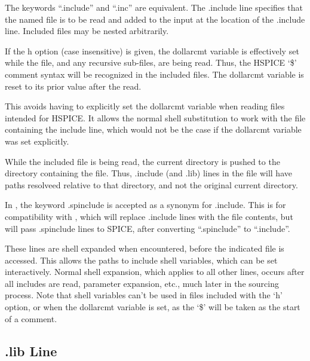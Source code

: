 The keywords ``{\vt .include}'' and ``{\vt .inc}'' are equivalent. 
The {\vt .include} line specifies that the named file is to be read
and added to the input at the location of the {\vt .include} line. 
Included files may be nested arbitrarily.

If the {\vt h} option (case insensitive) is given, the {\et dollarcmt}
variable is effectively set while the file, and any recursive
sub-files, are being read.  Thus, the HSPICE `{\vt \$}' comment syntax
will be recognized in the included files.  The {\et dollarcmt}
variable is reset to its prior value after the read.

This avoids having to explicitly set the {\et dollarcmt} variable when
reading files intended for HSPICE.  It allows the normal {\WRspice}
shell substitution to work with the file containing the include line,
which would not be the case if the {\et dollarcmt} variable was set
explicitly.

While the included file is being read, the current directory is pushed
to the directory containing the file.  Thus, {\vt .include} (and {\vt
.lib}) lines in the file will have paths resolveed relative to that
directory, and not the original current directory.

In {\WRspice}, the keyword {\vt .spinclude} is accepted as a synonym
for {\vt .include}.  This is for compatibility with {\Xic}, which will
replace {\vt .include} lines with the file contents, but will pass
{\vt .spinclude} lines to SPICE, after converting ``{\vt .spinclude}''
to ``{\vt .include}''.

These lines are shell expanded when encountered, before the indicated
file is accessed.  This allows the paths to include shell variables,
which can be set interactively.  Normal shell expansion, which applies
to all other lines, occurs after all includes are read, parameter
expansion, etc., much later in the sourcing process.  Note that shell
variables can't be used in files included with the `{\vt h}' option,
or when the {\et dollarcmt} variable is set, as the `{\vt \$}' will be
taken as the start of a comment.

\subsection{{\vt .lib} Line}

